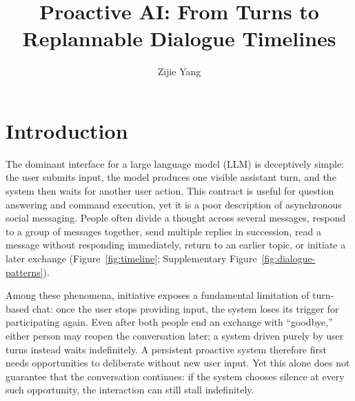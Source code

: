 \documentclass[manuscript,nonacm]{acmart}
\title{Proactive AI: From Turns to Replannable Dialogue Timelines}
\author{Zijie Yang}
\affiliation{%
  \institution{Airalogy}
  \city{Hangzhou}
  \country{China}
}
\begin{document}
\maketitle

\section{Introduction}

The dominant interface for a large language model (LLM) is deceptively simple:
the user submits input, the model produces one visible assistant turn, and the
system then waits for another user action. This contract is useful for question
answering and command execution, yet it is a poor description of asynchronous
social messaging. People often divide a thought across several messages, respond
to a group of messages together, send multiple replies in succession, read a
message without responding immediately, return to an earlier topic, or initiate
a later exchange (Figure~\ref{fig:timeline}; Supplementary Figure~\ref{fig:dialogue-patterns}).

Among these phenomena, initiative exposes a fundamental limitation of turn-based
chat: once the user stops providing input, the system loses its trigger for
participating again. Even after both people end an exchange with ``goodbye,''
either person may reopen the conversation later; a system driven purely by user
turns instead waits indefinitely. A persistent proactive system therefore first
needs opportunities to deliberate without new user input. Yet this alone does
not guarantee that the conversation continues: if the system chooses silence at
every such opportunity, the interaction can still stall indefinitely.
\end{document}
